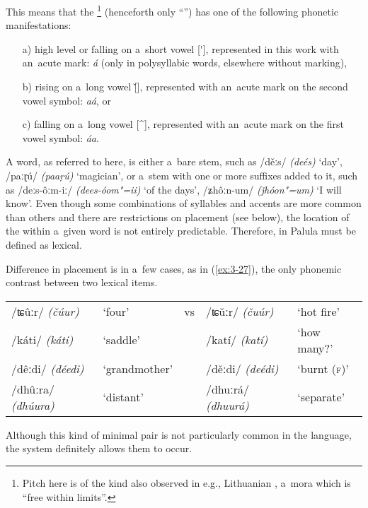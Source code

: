 This means that the \footnote{Pitch  here is of the kind also observed in e.g., Lithuanian \citep[73--82]{szemerenyi1996}, a~mora  which is ``free within limits''.} (henceforth only ``'') has one of the following phonetic manifestations:
\begin{enumerate}
\item[a)] high level or falling on a~short vowel [\'{}], represented in this work with an~acute  mark: \textit{á} (only in polysyllabic words, elsewhere without marking), 
\item[b)] rising on a~long vowel [\v{}], represented with an~acute  mark on the second vowel symbol: \textit{aá}, or 
\item[c)] falling on a~long vowel [\^{}], represented with an~acute  mark on the first vowel symbol: \textit{áa}.
\end{enumerate}
A word, as referred to here, is either a~bare stem, such as /děːs/ \textit{(deés)} `day', /paːɽú/ \textit{(paaṛú)} `magician', or a~stem with one or more suffixes added to it, such as /deːs-ôːm-iː/ \textit{(dees-óom"=ii)} `of the days', /ʑhôːn-um/ \textit{(ǰhóon"=um)} `I will know'. Even though some combinations of syllables and accents are more common than others and there are restrictions on  placement (see below), the location of the  within a~given word is not entirely predictable. Therefore,  in Palula must be defined as lexical. 


Difference in  placement is in a~few cases, as in (\ref{ex:3-27}), the only phonemic contrast between two lexical items.


\begin{exe}
\extab
\label{ex:3-27}
\begin{tabularx}{116mm}{ l l l l l }
/ʨûːr/ \textit{(čúur)} &
`four' &
vs &
/ʨǔːr/ \textit{(čuúr)} &
`hot fire'\\
/káti/ \textit{(káti)} &
`saddle' &
&
/katí/ \textit{(katí)} &
`how many?'\\
/dêːdi/ \textit{(déedi)} &
`grandmother' &
&
/děːdi/ \textit{(deédi)} &
`burnt (\textsc{f})'\\
/dhûːra/ \textit{(dhúura)} &
`distant' &
&
/dhuːrá/ \textit{(dhuurá)} &
`separate'\\
\end{tabularx}
\end{exe}

Although this kind of minimal pair is not particularly common in the language, the system definitely allows them to occur.

